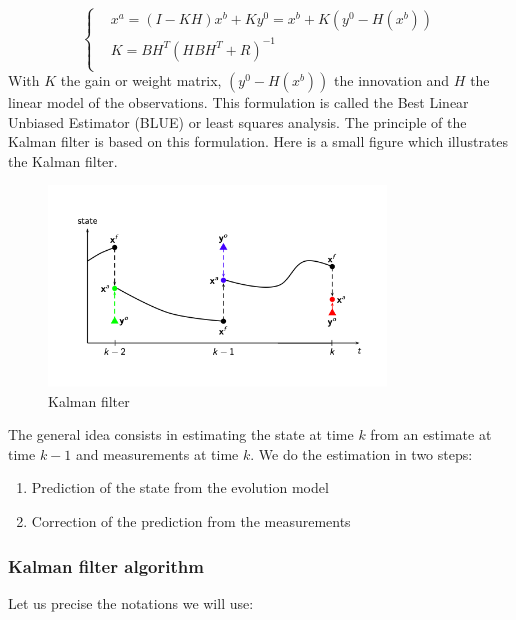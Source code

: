 $$\left\{\begin{aligned}
		&x^a=(I-KH)x^b+Ky^0=x^b+K(y^0-H(x^b)) \\
        &K=BH^T(HBH^T+R)^{-1} \\
	\end{aligned}\right.$$
With $K$ the gain or weight matrix, $(y^0-H(x^b))$ the innovation and $H$ the linear model of the observations.
This formulation is called the Best Linear Unbiased Estimator (BLUE) or least squares analysis.
The principle of the Kalman filter is based on this formulation. Here is a small figure which illustrates the Kalman filter.
\vspace*{5mm}
\begin{figure}
    \centering
		\includegraphics[width=0.8\textwidth]{"images/enkf/schema_kalman_filter.png"}
	\caption{Kalman filter}
\end{figure}
The general idea consists in estimating the state at time $k$ from an estimate at time $k-1$ and measurements at time $k$.
We do the estimation in two steps:
\begin{enumerate}[label=\textbullet]
		\item Prediction of the state from the evolution model
		\item Correction of the prediction from the measurements
	\end{enumerate}

\subsubsection{Kalman filter algorithm}
Let us precise the notations we will use:

